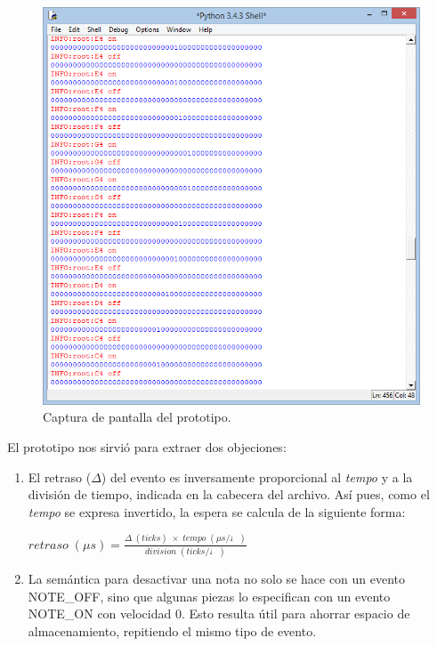 \begin{figure}[H]
	\noindent \begin{centering}
		\includegraphics[width=\linewidth/2]{capitulo5/cap_pytest}
		\par\end{centering}
	\smallskip
	\caption{\label{fig:cap_pytest} Captura de pantalla del prototipo.}
\end{figure}

\smallskip

El prototipo nos sirvió para extraer dos objeciones:

\begin{enumerate}
	\item El retraso ($\Delta$) del evento es inversamente proporcional al \textit{tempo} y a la división de tiempo, indicada en la cabecera del archivo. Así pues, como el \textit{tempo} se expresa invertido, la espera se calcula de la siguiente forma:
	
	\begin{center}
		$retraso \; (\mu s)  = \frac{\Delta \; (ticks) \; \times \; tempo \; (\mu s / \quarternote)}{division \; (ticks / \quarternote)}$
	\end{center}
	
	\item La semántica para desactivar una nota no solo se hace con un evento NOTE\_OFF, sino que algunas piezas lo especifican con un evento NOTE\_ON con velocidad 0. Esto resulta útil para ahorrar espacio de almacenamiento, repitiendo el mismo tipo de evento.
\end{enumerate}

